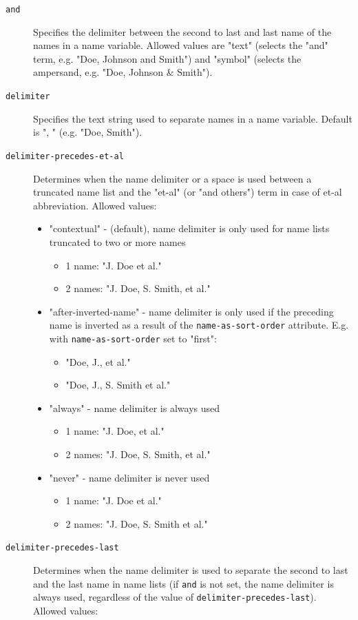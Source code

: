 \begin{description}
\item[\texttt{and}]
Specifies the delimiter between the second to last and last name of the
names in a name variable. Allowed values are "text" (selects the "and"
term, e.g. "Doe, Johnson and Smith") and "symbol" (selects the
ampersand, e.g. "Doe, Johnson \& Smith").
\item[\texttt{delimiter}]
Specifies the text string used to separate names in a name variable.
Default is ", " (e.g. "Doe, Smith").
\item[\texttt{delimiter-precedes-et-al}]
Determines when the name delimiter or a space is used between a
truncated name list and the "et-al" (or "and others") term in case of
et-al abbreviation. Allowed values:

\begin{itemize}
\tightlist
\item
  "contextual" - (default), name delimiter is only used for name lists
  truncated to two or more names

  \begin{itemize}
  \tightlist
  \item
    1 name: "J. Doe et al."
  \item
    2 names: "J. Doe, S. Smith, et al."
  \end{itemize}
\item
  "after-inverted-name" - name delimiter is only used if the preceding
  name is inverted as a result of the \texttt{name-as-sort-order}
  attribute. E.g. with \texttt{name-as-sort-order} set to "first":

  \begin{itemize}
  \tightlist
  \item
    "Doe, J., et al."
  \item
    "Doe, J., S. Smith et al."
  \end{itemize}
\item
  "always" - name delimiter is always used

  \begin{itemize}
  \tightlist
  \item
    1 name: "J. Doe, et al."
  \item
    2 names: "J. Doe, S. Smith, et al."
  \end{itemize}
\item
  "never" - name delimiter is never used

  \begin{itemize}
  \tightlist
  \item
    1 name: "J. Doe et al."
  \item
    2 names: "J. Doe, S. Smith et al."
  \end{itemize}
\end{itemize}
\item[\texttt{delimiter-precedes-last}]
Determines when the name delimiter is used to separate the second to
last and the last name in name lists (if \texttt{and} is not set, the
name delimiter is always used, regardless of the value of
\texttt{delimiter-precedes-last}). Allowed values:


\end{description}
